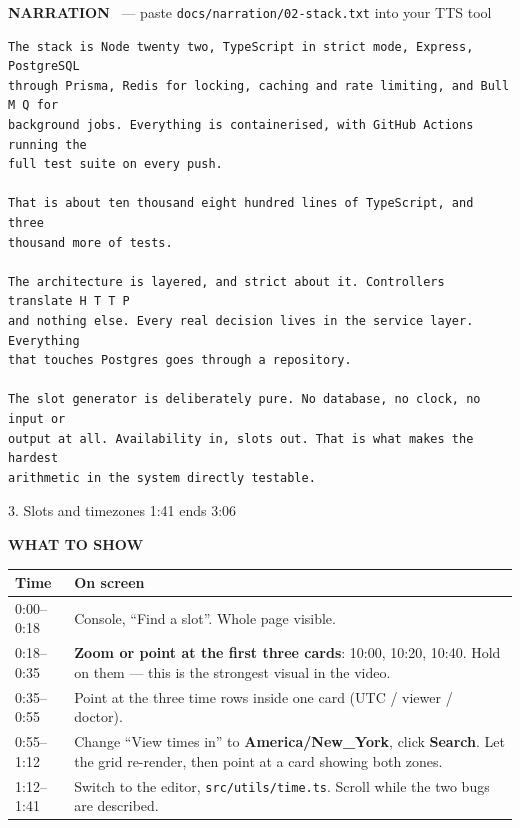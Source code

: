 \documentclass[11pt,a4paper]{article}
\newcommand{\segbar}[3]{%
  \vspace{12pt}
  \noindent\colorbox{accent}{\parbox{\dimexpr\textwidth-2\fboxsep}{%
    \color{white}\bfseries\large\strut #1 \hfill \normalsize #2 \quad ends #3}}
  \par\vspace{7pt}}
\newcommand{\showhdr}{\noindent\textcolor{showc}{\textbf{WHAT TO SHOW}}\par\vspace{2pt}}
\newcommand{\voicehdr}[1]{\vspace{4pt}\noindent\textcolor{voice}{\textbf{NARRATION}}%
  \ \textcolor{soft}{\small --- paste \texttt{docs/narration/#1.txt} into your TTS tool}\par\vspace{2pt}}
\begin{document}
\voicehdr{02-stack}
\begin{lstlisting}[style=tts]
The stack is Node twenty two, TypeScript in strict mode, Express, PostgreSQL
through Prisma, Redis for locking, caching and rate limiting, and Bull M Q for
background jobs. Everything is containerised, with GitHub Actions running the
full test suite on every push.

That is about ten thousand eight hundred lines of TypeScript, and three
thousand more of tests.

The architecture is layered, and strict about it. Controllers translate H T T P
and nothing else. Every real decision lives in the service layer. Everything
that touches Postgres goes through a repository.

The slot generator is deliberately pure. No database, no clock, no input or
output at all. Availability in, slots out. That is what makes the hardest
arithmetic in the system directly testable.
\end{lstlisting}

\segbar{3. Slots and timezones}{1:41}{3:06}

\showhdr
\begin{longtable}{@{}p{1.6cm} p{13.4cm}@{}}
\toprule
\textbf{Time} & \textbf{On screen} \\
\midrule
\endhead
0:00--0:18 & Console, ``Find a slot''. Whole page visible. \\
0:18--0:35 & \textbf{Zoom or point at the first three cards}: 10:00, 10:20, 10:40.
             Hold on them --- this is the strongest visual in the video. \\
0:35--0:55 & Point at the three time rows inside one card (UTC / viewer / doctor). \\
0:55--1:12 & Change ``View times in'' to \textbf{America/New\_York}, click \textbf{Search}.
             Let the grid re-render, then point at a card showing both zones. \\
1:12--1:41 & Switch to the editor, \texttt{src/utils/time.ts}. Scroll while the two
             bugs are described. \\
\bottomrule
\end{longtable}
\end{document}
